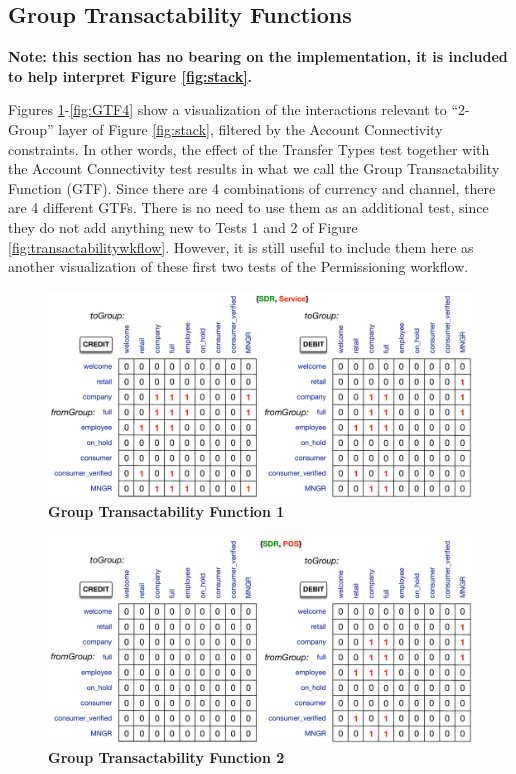 \subsection{Group Transactability Functions}
\textbf{\small Note: this section has no bearing on the implementation, it is included to help interpret Figure \ref{fig:stack}.}

Figures \ref{fig:GTF1}-\ref{fig:GTF4} show a visualization of the interactions relevant to ``2-Group'' layer of Figure \ref{fig:stack}, filtered by the Account Connectivity constraints. In other words, the effect of the Transfer Types test together with the Account Connectivity test results in what we call the Group Transactability Function (GTF). Since there are 4 combinations of currency and channel, there are 4 different GTFs. There is no need to use them as an additional test, since they do not add anything new to Tests 1 and 2 of Figure \ref{fig:transactabilitywkflow}. However, it is still useful to include them here as another visualization of these first two tests of the Permissioning workflow.

\begin{figure}[H]
\centering
\includegraphics[width=16cm]{Figures/GTF1}
\caption{\small\textbf{Group Transactability Function 1}}
\label{fig:GTF1}
\end{figure}

\begin{figure}[H]
\vspace{-0.3cm}
\centering
\includegraphics[width=16cm]{Figures/GTF2}
\caption{\small\textbf{Group Transactability Function 2}}
\label{fig:GTF2}
\end{figure}
\vspace{-1cm}

